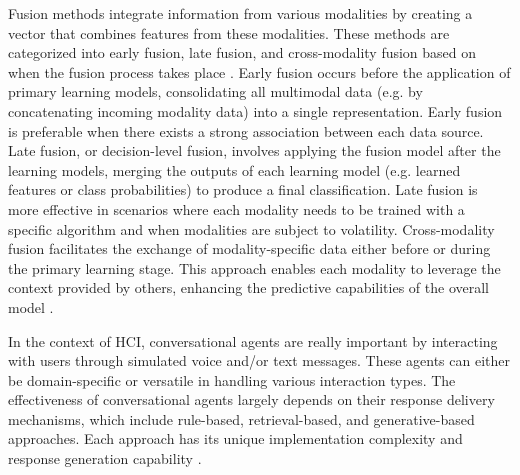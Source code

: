\documentclass[runningheads]{llncs}
\begin{document}
Fusion methods integrate information from various modalities by creating a vector that combines features from these modalities. These methods are categorized into early fusion, late fusion, and cross-modality fusion based on when the fusion process takes place \cite{sleeman_multimodal_2022, zhu_multimodal_2023}. Early fusion occurs before the application of primary learning models, consolidating all multimodal data (e.g. by concatenating incoming modality data) into a single representation. Early fusion is preferable when there exists a strong association between each data source. Late fusion, or decision-level fusion, involves applying the fusion model after the learning models, merging the outputs of each learning model (e.g. learned features or class probabilities) to produce a final classification. Late fusion is more effective in scenarios where each modality needs to be trained with a specific algorithm and when modalities are subject to volatility. Cross-modality fusion facilitates the exchange of modality-specific data either before or during the primary learning stage. This approach enables each modality to leverage the context provided by others, enhancing the predictive capabilities of the overall model \cite{sleeman_multimodal_2022}.

In the context of HCI, conversational agents are really important by interacting with users through simulated voice and/or text messages. These agents can either be domain-specific or versatile in handling various interaction types. The effectiveness of conversational agents largely depends on their response delivery mechanisms, which include rule-based, retrieval-based, and generative-based approaches. Each approach has its unique implementation complexity and response generation capability \cite{fernandes_survey_2020, ramesh_survey_2017}.
\end{document}
